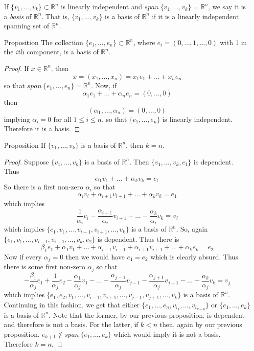 If \( \{v_1,\ldots,v_k\} \subset \mathbb{R}^n \) is linearly independent and \( span\:\{ v_1,\ldots,v_k \} = \mathbb{R}^n \),  we say it is a \emph{basis} of \( \mathbb{R}^n \). That is, \( \{v_1,\ldots,v_k\} \) is a basis of \( \mathbb{R}^n \) if it is a linearly independent spanning set of \( \mathbb{R}^n \).

\begin{thm}{Proposition}
    The collection \( \{ e_1,\ldots, e_n \} \subset \mathbb{R}^n \), where \linebreak \( e_i = (0,\ldots,1,\ldots,0) \) with 1 in the \(i\)th component, is a basis of \( \mathbb{R}^n \).
\end{thm}
\begin{proof}
    If \( x \in \mathbb{R}^n \), then
    \[
    x = (x_1,\ldots,x_n) = x_1e_1+\ldots+x_ne_n
    \]
    so that \( span\: \{e_1,\ldots,e_n\} = \mathbb{R}^n \). Now, if
    \[
    \alpha_1e_1+\ldots+\alpha_ne_n = (0,\ldots,0)
    \]
    then
    \[
    (\alpha_1,\ldots,\alpha_n) = (0,\ldots,0)
    \]
    implying \( \alpha_i = 0 \) for all \( 1 \leq i \leq n \), so that \( \{e_1,\ldots,e_n\} \) is linearly independent. Therefore it is a basis.
\end{proof}

\begin{thm}{Proposition}
    If \( \{v_1,\ldots,v_k \} \) is a basis of \( \mathbb{R}^n \), then \( k = n \).
\end{thm}
\begin{proof}
    Suppose \( \{v_1,\ldots,v_k\} \) is a basis of \( \mathbb{R}^n \). Then \( \{ v_1,\ldots,v_k,e_1 \} \) is dependent. Thus
    \[
    \alpha_1v_1+\ldots+\alpha_kv_k=e_1
    \]
    So there is a first non-zero \( \alpha_i \) so that
    \[
    \alpha_iv_i+\alpha_{i+1}v_{i+1}+\ldots+\alpha_kv_k= e_1
    \]
    which implies
    \[
    \frac{1}{\alpha_i}e_i-\frac{\alpha_{i+1}}{\alpha_i}v_{i+1}-\ldots-\frac{\alpha_k}{\alpha_i}v_k = v_i
    \]
    which implies \( \{ e_1,v_1,\ldots,v_{i-1},v_{i+1},\ldots,v_k \} \) is a basis of \( \mathbb{R}^n \). So, again \linebreak \( \{ e_1,v_1,\ldots,v_{i-1},v_{i+1},\ldots,v_k,e_2 \} \) is dependent. Thus there is
    \[
    \beta_1e_1+\alpha_1v_1+\ldots+\alpha_{i-1}v_{i-1}+\alpha_{i+1}v_{i+1}+\ldots+\alpha_ke_k = e_2
    \]
    Now if every \( \alpha_j = 0 \) then we would have \( e_1=e_2 \) which is clearly absurd. Thus there is some first non-zero \( \alpha_j \) so that
    \[
    -\frac{\beta_1}{\alpha_j}e_1+\frac{1}{\alpha_j}e_2-\frac{\alpha_1}{\alpha_j}v_1-\ldots-\frac{\alpha_{j-1}}{\alpha_j}v_{j-1}-\frac{\alpha_{j+1}}{\alpha_j}v_{j+1}-\ldots-\frac{\alpha_k}{\alpha_j}v_k = v_j
    \]
    which implies \( \{ e_1,e_2,v_1,\ldots,v_{i-1},v_{i+1},\ldots,v_{j-1},v_{j+1},\ldots,v_k \} \) is a basis of \( \mathbb{R}^n \). Continuing in this fashion, we get that either \( \{ e_1,\ldots,e_n,v_{i_1},\ldots,v_{i_{k-n}} \} \) or \( \{ e_1,\ldots,e_k \} \) is a basis of \( \mathbb{R}^n \). Note that the former, by our previous proposition, is dependent and therefore is not a basis. For the latter, if \( k < n \) then, again by our previous proposition, \( e_{k+1} \not\in span\:\{ e_1,\ldots,e_k \} \) which would imply it is not a basis. Therefore \( k = n \).
\end{proof}

